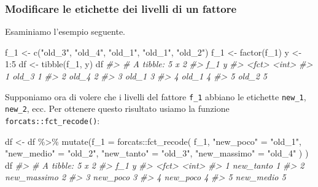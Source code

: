 \documentclass[
  10pt,
  italian,
  a4paper,
  extrafontsizes,onecolumn,openright
  ]{memoir}
\newenvironment{Shaded}{\begin{snugshade}}{\end{snugshade}}
\newcommand{\AttributeTok}[1]{\textcolor[rgb]{0.77,0.63,0.00}{#1}}
\newcommand{\CommentTok}[1]{\textcolor[rgb]{0.56,0.35,0.01}{\textit{#1}}}
\newcommand{\DecValTok}[1]{\textcolor[rgb]{0.00,0.00,0.81}{#1}}
\newcommand{\FunctionTok}[1]{\textcolor[rgb]{0.00,0.00,0.00}{#1}}
\newcommand{\NormalTok}[1]{#1}
\newcommand{\OtherTok}[1]{\textcolor[rgb]{0.56,0.35,0.01}{#1}}
\newcommand{\SpecialCharTok}[1]{\textcolor[rgb]{0.00,0.00,0.00}{#1}}
\newcommand{\StringTok}[1]{\textcolor[rgb]{0.31,0.60,0.02}{#1}}
\begin{document}
\hypertarget{modificare-le-etichette-dei-livelli-di-un-fattore}{%
\subsubsection{Modificare le etichette dei livelli di un fattore}\label{modificare-le-etichette-dei-livelli-di-un-fattore}}

Esaminiamo l'esempio seguente.

\begin{Shaded}
\begin{Highlighting}[]
\NormalTok{f\_1 }\OtherTok{\textless{}{-}} \FunctionTok{c}\NormalTok{(}\StringTok{"old\_3"}\NormalTok{, }\StringTok{"old\_4"}\NormalTok{, }\StringTok{"old\_1"}\NormalTok{, }\StringTok{"old\_1"}\NormalTok{, }\StringTok{"old\_2"}\NormalTok{)}
\NormalTok{f\_1 }\OtherTok{\textless{}{-}} \FunctionTok{factor}\NormalTok{(f\_1)}
\NormalTok{y }\OtherTok{\textless{}{-}} \DecValTok{1}\SpecialCharTok{:}\DecValTok{5}
\NormalTok{df }\OtherTok{\textless{}{-}} \FunctionTok{tibble}\NormalTok{(f\_1, y)}
\NormalTok{df}
\CommentTok{\#\textgreater{} \# A tibble: 5 x 2}
\CommentTok{\#\textgreater{}   f\_1       y}
\CommentTok{\#\textgreater{}   \textless{}fct\textgreater{} \textless{}int\textgreater{}}
\CommentTok{\#\textgreater{} 1 old\_3     1}
\CommentTok{\#\textgreater{} 2 old\_4     2}
\CommentTok{\#\textgreater{} 3 old\_1     3}
\CommentTok{\#\textgreater{} 4 old\_1     4}
\CommentTok{\#\textgreater{} 5 old\_2     5}
\end{Highlighting}
\end{Shaded}

\noindent
Supponiamo ora di volere che i livelli del fattore \texttt{f\_1} abbiano le etichette \texttt{new\_1}, \texttt{new\_2}, ecc. Per ottenere questo risultato usiamo la funzione \texttt{forcats::fct\_recode()}:

\begin{Shaded}
\begin{Highlighting}[]
\NormalTok{df }\OtherTok{\textless{}{-}}\NormalTok{ df }\SpecialCharTok{\%\textgreater{}\%}
  \FunctionTok{mutate}\NormalTok{(}\AttributeTok{f\_1 =}
\NormalTok{    forcats}\SpecialCharTok{::}\FunctionTok{fct\_recode}\NormalTok{(}
\NormalTok{      f\_1, }
      \StringTok{"new\_poco"} \OtherTok{=} \StringTok{"old\_1"}\NormalTok{, }
      \StringTok{"new\_medio"} \OtherTok{=} \StringTok{"old\_2"}\NormalTok{, }
      \StringTok{"new\_tanto"} \OtherTok{=} \StringTok{"old\_3"}\NormalTok{, }
      \StringTok{"new\_massimo"} \OtherTok{=} \StringTok{"old\_4"}
\NormalTok{      )}
\NormalTok{   )}
\NormalTok{df}
\CommentTok{\#\textgreater{} \# A tibble: 5 x 2}
\CommentTok{\#\textgreater{}   f\_1             y}
\CommentTok{\#\textgreater{}   \textless{}fct\textgreater{}       \textless{}int\textgreater{}}
\CommentTok{\#\textgreater{} 1 new\_tanto       1}
\CommentTok{\#\textgreater{} 2 new\_massimo     2}
\CommentTok{\#\textgreater{} 3 new\_poco        3}
\CommentTok{\#\textgreater{} 4 new\_poco        4}
\CommentTok{\#\textgreater{} 5 new\_medio       5}
\end{Highlighting}
\end{Shaded}
\end{document}
